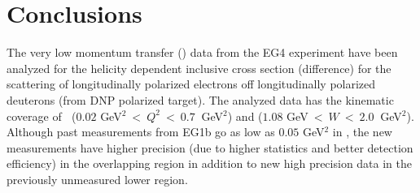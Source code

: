 \clearpage
%
\chapter{Conclusions}
\label{cha:conclusions}




\hspace{0.5cm}


The very low momentum transfer (\qsq) data from the EG4 experiment have been analyzed for the helicity 
dependent inclusive cross section (difference) for the scattering of longitudinally polarized 
electrons off longitudinally polarized deuterons (from DNP polarized  target). %
 The analyzed data has the kinematic coverage of $~$ ($0.02$ GeV$^2 ~ \lt ~Q^2 ~ \lt ~ 0.7 ~$ GeV$^2$) and ($1.08$ GeV$ ~ \lt ~W ~ \lt ~ 2.0 ~$ GeV$^2$). Although past measurements from EG1b go as low as $0.05$ GeV$^2$ in \qsq, the new measurements have higher precision (due to higher statistics and better detection efficiency) in the overlapping region in addition to new high precision data in the previously unmeasured lower \qsqs region. %


